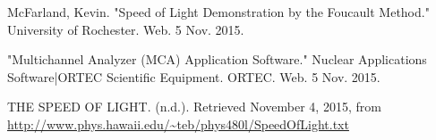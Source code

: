\documentclass[aps,prl,twocolumn,superscriptaddress,nofootinbib]{revtex4-1}
\begin{document}
\setlength{\parindent}{0cm}

\begin{thebibliography}{99}  %

 McFarland, Kevin. "Speed of Light Demonstration by the Foucault Method." University of Rochester. Web. 5 Nov. 2015.     %

 "Multichannel Analyzer (MCA) Application Software." Nuclear Applications Software|ORTEC Scientific Equipment. ORTEC. Web. 5 Nov. 2015.

 THE SPEED OF LIGHT. (n.d.). Retrieved November 4, 2015, from \url{http://www.phys.hawaii.edu/~teb/phys480l/SpeedOfLight.txt}




\end{thebibliography}
\end{document}
